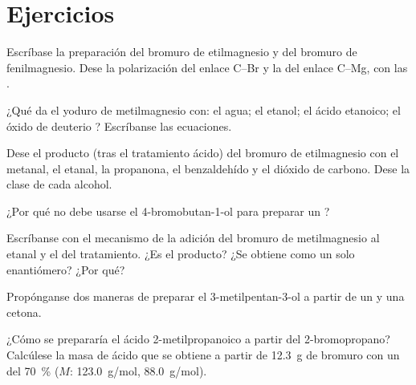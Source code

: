 \section{Ejercicios}

\begin{exercise}[$\star$]\label{exo:b1:organomagnesium:1}
Escríbase la preparación del bromuro de etilmagnesio y del bromuro de
fenilmagnesio. Dese la polarización del enlace C--Br y la del enlace
C--Mg, con las .
\end{exercise}

\begin{exercise}[$\star$]\label{exo:b1:organomagnesium:2}
¿Qué da el yoduro de metilmagnesio con: el agua; el etanol; el ácido
etanoico; el óxido de deuterio ? Escríbanse las ecuaciones.
\end{exercise}

\begin{exercise}[$\star$]\label{exo:b1:organomagnesium:3}
Dese el producto (tras el tratamiento ácido) del bromuro de etilmagnesio
con el metanal, el etanal, la propanona, el benzaldehído y el dióxido de
carbono. Dese la clase de cada alcohol.
\end{exercise}

\begin{exercise}[$\star$]\label{exo:b1:organomagnesium:4}
¿Por qué no debe usarse el 4-bromobutan-1-ol para preparar un ?
\end{exercise}

\begin{exercise}[$\star\star$]\label{exo:b1:organomagnesium:5}
Escríbanse con  el mecanismo de la adición del bromuro de
metilmagnesio al etanal y el del tratamiento. ¿Es  el producto? ¿Se
obtiene como un solo enantiómero? ¿Por qué?
\end{exercise}

\begin{exercise}[$\star\star$]\label{exo:b1:organomagnesium:6}
Propónganse dos maneras de preparar el 3-metilpentan-3-ol a partir de un
 y una cetona.
\end{exercise}

\begin{exercise}[$\star\star$]\label{exo:b1:organomagnesium:7}
¿Cómo se prepararía el ácido 2-metilpropanoico a partir del
2-bromopropano? Calcúlese la masa de ácido que se obtiene a partir de
\qty{12.3}{g} de bromuro con un  del \qty{70}{\percent}
($M$:  \qty{123.0}{g/mol},  \qty{88.0}{g/mol}).
\end{exercise}

